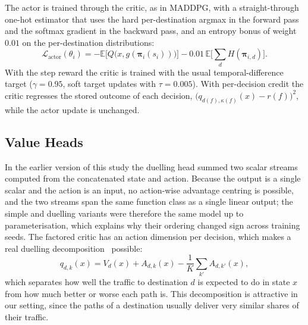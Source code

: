 \documentclass[10pt,journal,comsoc]{IEEEtran}
\begin{document}
The actor is trained through the critic, as in MADDPG, with a straight-through one-hot estimator that uses the hard per-destination argmax in the forward pass and the softmax gradient in the backward pass, and an entropy bonus of weight $0.01$ on the per-destination distributions:
\begin{equation}
  \mathcal{L}_{\text{actor}}(\theta_i) = -\mathbb{E}\big[Q\big(x, g(\boldsymbol{\pi}_i(s_i))\big)\big] - 0.01\, \mathbb{E}\big[\textstyle\sum_d H(\boldsymbol{\pi}_{i,d})\big].
\end{equation}
With the step reward the critic is trained with the usual temporal-difference target ($\gamma = 0.95$, soft target updates with $\tau = 0.005$). With per-decision credit the critic regresses the stored outcome of each decision, $\big(q_{d(f),\kappa(f)}(x) - r(f)\big)^2$, while the actor update is unchanged.

\subsection{Value Heads}
In the earlier version of this study the duelling head summed two scalar streams computed from the concatenated state and action. Because the output is a single scalar and the action is an input, no action-wise advantage centring is possible, and the two streams span the same function class as a single linear output; the simple and duelling variants were therefore the same model up to parameterisation, which explains why their ordering changed sign across training seeds. The factored critic has an action dimension per decision, which makes a real duelling decomposition~\cite{wang2016dueling} possible:
\begin{equation}
  q_{d,k}(x) = V_d(x) + A_{d,k}(x) - \frac{1}{K}\sum_{k'} A_{d,k'}(x),
  \label{eq:duelling}
\end{equation}
which separates how well the traffic to destination $d$ is expected to do in state $x$ from how much better or worse each path is. This decomposition is attractive in our setting, since the paths of a destination usually deliver very similar shares of their traffic.
\end{document}
